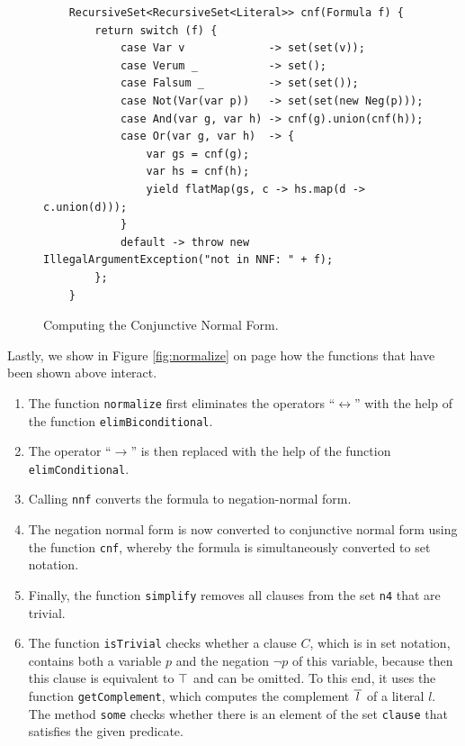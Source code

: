 \begin{figure}[!ht]
  \centering
\begin{verbatim}
    RecursiveSet<RecursiveSet<Literal>> cnf(Formula f) {
        return switch (f) {
            case Var v             -> set(set(v));
            case Verum _           -> set();
            case Falsum _          -> set(set());
            case Not(Var(var p))   -> set(set(new Neg(p)));
            case And(var g, var h) -> cnf(g).union(cnf(h));
            case Or(var g, var h)  -> {
                var gs = cnf(g);
                var hs = cnf(h);
                yield flatMap(gs, c -> hs.map(d -> c.union(d)));
            }
            default -> throw new IllegalArgumentException("not in NNF: " + f);
        };
    }
\end{verbatim}
\vspace*{-0.3cm}
  \caption{Computing the Conjunctive Normal Form. }
  \label{fig:cnf}
\end{figure}
Lastly, we show in Figure \ref{fig:normalize} on page \pageref{fig:normalize}
how the functions that have been shown above interact.
\begin{enumerate}
\item The function \texttt{normalize} first eliminates the operators ``$\leftrightarrow$''
       with the help of the function 
      \texttt{elimBiconditional}.
\item The operator ``$\rightarrow$'' is then replaced with the help of the function
      \texttt{elimConditional}.
\item Calling \texttt{nnf} converts the formula to negation-normal form.
\item The negation normal form is now converted to conjunctive normal form using the function \texttt{cnf},
      whereby the formula is simultaneously converted to set notation.  
\item Finally, the function \texttt{simplify} removes all clauses from the set \texttt{n4} that are trivial.
\item The function \texttt{isTrivial} checks whether a clause $C$, which is in set notation,
      contains both a variable $p$ and the negation $\neg p$ of this variable, because then this
      clause is equivalent to $\top$ and can be omitted.  To this end, it uses the function
      \texttt{getComplement}, which computes the complement $\overline{\,l\,}$ of a literal $l$.
      The method \texttt{some} checks whether there is an element of the set \texttt{clause} that satisfies
      the given predicate.
\end{enumerate}

